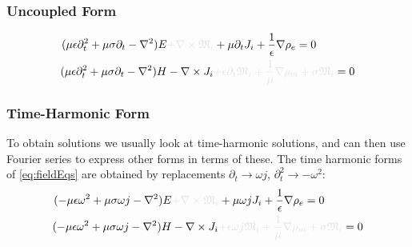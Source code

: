 \documentclass{article}
\numberwithin{equation}{section}
\begin{document}
        \subsubsection{Uncoupled Form}
            \begin{subequations} \label{eq:fieldEqs}
                \begin{align}
                    (\mu \epsilon \partial^2_t + \mu \sigma \partial_t - \nabla^2 ) E &
                        \begingroup \textcolor{vanish}{+ \nabla \times \mathfrak{M}_i} 
                        \endgroup + \mu \partial_t J_i + \frac{1}{\epsilon} \nabla
                        \rho_e = 0 \label{eq:electricFieldEq} \\
                    (\mu \epsilon \partial^2_t + \mu \sigma \partial_t - \nabla^2 ) H & -
                        \nabla \times J_i \begingroup \textcolor{vanish}{+ \epsilon
                        \partial_t \mathfrak{M}_i + \frac{1}{\mu} \nabla \rho_m + \sigma
                        \mathfrak{M}_i} \endgroup = 0 \label{eq:magneticFieldEq}
                \end{align}
            \end{subequations}
        \subsubsection{Time-Harmonic Form}
            To obtain solutions we usually look at time-harmonic solutions, and can then
            use Fourier series to express other forms in terms of these. The time
            harmonic forms of \eqref{eq:fieldEqs} are obtained by replacements
            $\partial_t \to \omega j$, $\partial_t^2 \to - \omega^2$:
            \begin{subequations} \label{eq:fieldEqsTH}
                \begin{align}
                    (- \mu \epsilon \omega^2 + \mu \sigma \omega j - \nabla^2 ) E &
                        \begingroup \textcolor{vanish}{+ \nabla \times \mathfrak{M}_i}
                        \endgroup + \mu \omega j J_i + \frac{1}{\epsilon} \nabla \rho_e
                        = 0 \label{eq:electricFieldEqTH} \\
                    (-\mu \epsilon \omega^2 + \mu \sigma \omega j - \nabla^2 ) H & -
                        \nabla \times J_i \begingroup \textcolor{vanish}{+ \epsilon
                        \omega j \mathfrak{M}_i + \frac{1}{\mu} \nabla \rho_m + \sigma
                        \mathfrak{M}_i} \endgroup = 0 \label{eq:magneticFieldEqTH}
                \end{align}
            \end{subequations}
\end{document}
